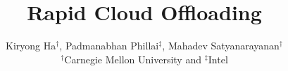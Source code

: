 

\title{\Large \bf 
Rapid Cloud Offloading
}
\author{Kiryong Ha$^{\dagger}$, Padmanabhan Phillai$^{\ddagger}$,  Mahadev Satyanarayanan$^{\dagger}$\\
$^{\dagger}$Carnegie Mellon University and $^{\ddagger}$Intel}
\date{}


\maketitle









\begin{footnotesize}
\setlength{\bibspacing}{\baselineskip}


\end{footnotesize}


